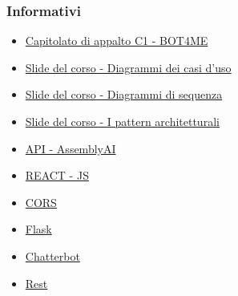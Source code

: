 \subsubsection{Informativi}
\begin{itemize}
    \item \href{https://www.math.unipd.it/~tullio/IS-1/2021/Progetto/C1.pdf}{\color{blue} Capitolato di appalto C1 - BOT4ME}
    \item \href{https://www.math.unipd.it/~rcardin/swea/2022/Diagrammi%20Use%20Case.pdf}{\color{blue} Slide del corso - Diagrammi dei casi d'uso}
    \item \href{https://www.math.unipd.it/~rcardin/swea/2022/Diagrammi%20di%20Sequenza.pdf}{\color{blue} Slide del corso - Diagrammi di sequenza}
    \item \href{https://www.math.unipd.it/~rcardin/swea/2022/Software%20Architecture%20Patterns.pdf}{\color{blue} Slide del corso - I pattern architetturali}
    \item \href{https://www.assemblyai.com/blog/the-top-free-speech-to-text-apis-and-open-source-engines/}{\color{blue} API - AssemblyAI}
    \item  \href{https://it.reactjs.org/}{\color{blue} REACT - JS}
    \item \href{https://developer.mozilla.org/en-US/docs/Web/HTTP/CORS/}{\color{blue} CORS}
    \item \href{https://flask.palletsprojects.com/en/2.2.x/}{\color{blue} Flask}
    \item  \href{https://chatterbot.readthedocs.io/en/stable/}{\color{blue} Chatterbot}
	\item  \href{https://restfulapi.net/}{\color{blue} Rest}    
\end{itemize}